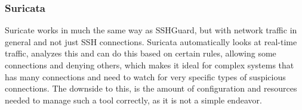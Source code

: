 \subsubsection{Suricata}
Suricate works in much the same way as SSHGuard, but with network traffic in general and not just SSH connections. Suricata automatically looks at real-time traffic, analyzes this and can do this based on certain rules, allowing some connections and denying others, which makes it ideal for complex systems that has many connections and need to watch for very specific types of suspicious connections. The downside to this, is the amount of configuration and resources needed to manage such a tool correctly, as it is not a simple endeavor.